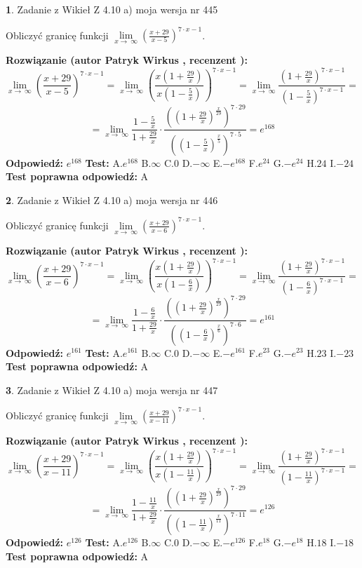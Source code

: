 \documentclass[12pt, a4paper]{article}
\theoremstyle{definition} %
\newtheorem{zad}{}
\newcommand{\zadStart}[1]{\begin{zad}#1\newline}
\newcommand{\zadStop}{\end{zad}}
\newcommand{\rozwStart}[2]{\noindent \textbf{Rozwiązanie (autor #1 , recenzent #2): }\newline}
\newcommand{\rozwStop}{\newline}
\newcommand{\odpStart}{\noindent \textbf{Odpowiedź:}\newline}
\newcommand{\odpStop}{\newline}
\newcommand{\testStart}{\noindent \textbf{Test:}\newline}
\newcommand{\testStop}{\newline}
\newcommand{\kluczStart}{\noindent \textbf{Test poprawna odpowiedź:}\newline}
\newcommand{\kluczStop}{\newline}
\begin{document}
\zadStart{Zadanie z Wikieł Z 4.10 a) moja wersja nr 445}

Obliczyć granicę funkcji  $\lim\limits_{x\to\ \infty}(\frac{x+29}{x-5})^{7\cdot x-1}$.
\zadStop
\rozwStart{Patryk Wirkus}{}
$$\lim\limits_{x\to\ \infty}(\frac{x+29}{x-5})^{7\cdot x-1} = \lim\limits_{x\to\ \infty}(\frac{x(1+\frac{29}{x})}{x(1-\frac{5}{x})})^{7\cdot x-1}=\lim\limits_{x\to\ \infty}\frac{(1+\frac{29}{x})^{7\cdot x-1}}{(1-\frac{5}{x})^{7\cdot x-1}}=$$
$$=\lim\limits_{x\to\ \infty}\frac{1-\frac{5}{x}}{1+\frac{29}{x}}\cdot\frac{((1+\frac{29}{x})^{\frac{x}{29}})^{7\cdot29}}{((1-\frac{5}{x})^{\frac{x}{5}})^{7\cdot5}}=e^{168}$$
\rozwStop
\odpStart
$e^{168}$
\odpStop
\testStart
A.$e^{168}$ B.$\infty$ C.$0$ D.$-\infty$ E.$-e^{168}$
F.$e^{24}$ G.$-e^{24}$
H.$24$
I.$-24$
\testStop
\kluczStart
A
\kluczStop



\zadStart{Zadanie z Wikieł Z 4.10 a) moja wersja nr 446}

Obliczyć granicę funkcji  $\lim\limits_{x\to\ \infty}(\frac{x+29}{x-6})^{7\cdot x-1}$.
\zadStop
\rozwStart{Patryk Wirkus}{}
$$\lim\limits_{x\to\ \infty}(\frac{x+29}{x-6})^{7\cdot x-1} = \lim\limits_{x\to\ \infty}(\frac{x(1+\frac{29}{x})}{x(1-\frac{6}{x})})^{7\cdot x-1}=\lim\limits_{x\to\ \infty}\frac{(1+\frac{29}{x})^{7\cdot x-1}}{(1-\frac{6}{x})^{7\cdot x-1}}=$$
$$=\lim\limits_{x\to\ \infty}\frac{1-\frac{6}{x}}{1+\frac{29}{x}}\cdot\frac{((1+\frac{29}{x})^{\frac{x}{29}})^{7\cdot29}}{((1-\frac{6}{x})^{\frac{x}{6}})^{7\cdot6}}=e^{161}$$
\rozwStop
\odpStart
$e^{161}$
\odpStop
\testStart
A.$e^{161}$ B.$\infty$ C.$0$ D.$-\infty$ E.$-e^{161}$
F.$e^{23}$ G.$-e^{23}$
H.$23$
I.$-23$
\testStop
\kluczStart
A
\kluczStop



\zadStart{Zadanie z Wikieł Z 4.10 a) moja wersja nr 447}

Obliczyć granicę funkcji  $\lim\limits_{x\to\ \infty}(\frac{x+29}{x-11})^{7\cdot x-1}$.
\zadStop
\rozwStart{Patryk Wirkus}{}
$$\lim\limits_{x\to\ \infty}(\frac{x+29}{x-11})^{7\cdot x-1} = \lim\limits_{x\to\ \infty}(\frac{x(1+\frac{29}{x})}{x(1-\frac{11}{x})})^{7\cdot x-1}=\lim\limits_{x\to\ \infty}\frac{(1+\frac{29}{x})^{7\cdot x-1}}{(1-\frac{11}{x})^{7\cdot x-1}}=$$
$$=\lim\limits_{x\to\ \infty}\frac{1-\frac{11}{x}}{1+\frac{29}{x}}\cdot\frac{((1+\frac{29}{x})^{\frac{x}{29}})^{7\cdot29}}{((1-\frac{11}{x})^{\frac{x}{11}})^{7\cdot11}}=e^{126}$$
\rozwStop
\odpStart
$e^{126}$
\odpStop
\testStart
A.$e^{126}$ B.$\infty$ C.$0$ D.$-\infty$ E.$-e^{126}$
F.$e^{18}$ G.$-e^{18}$
H.$18$
I.$-18$
\testStop
\kluczStart
A
\kluczStop
\end{document}
